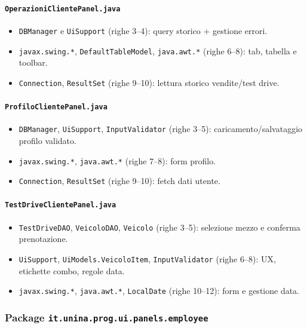 \documentclass[12pt,a4paper]{article}
\begin{document}
\paragraph{\texttt{OperazioniClientePanel.java}}
\begin{itemize}
  \item \texttt{DBManager} e \texttt{UiSupport} (righe 3--4): query storico + gestione errori.
  \item \texttt{javax.swing.*}, \texttt{DefaultTableModel}, \texttt{java.awt.*} (righe 6--8): tab, tabella e toolbar.
  \item \texttt{Connection}, \texttt{ResultSet} (righe 9--10): lettura storico vendite/test drive.
\end{itemize}

\paragraph{\texttt{ProfiloClientePanel.java}}
\begin{itemize}
  \item \texttt{DBManager}, \texttt{UiSupport}, \texttt{InputValidator} (righe 3--5): caricamento/salvataggio profilo validato.
  \item \texttt{javax.swing.*}, \texttt{java.awt.*} (righe 7--8): form profilo.
  \item \texttt{Connection}, \texttt{ResultSet} (righe 9--10): fetch dati utente.
\end{itemize}

\paragraph{\texttt{TestDriveClientePanel.java}}
\begin{itemize}
  \item \texttt{TestDriveDAO}, \texttt{VeicoloDAO}, \texttt{Veicolo} (righe 3--5): selezione mezzo e conferma prenotazione.
  \item \texttt{UiSupport}, \texttt{UiModels.VeicoloItem}, \texttt{InputValidator} (righe 6--8): UX, etichette combo, regole data.
  \item \texttt{javax.swing.*}, \texttt{java.awt.*}, \texttt{LocalDate} (righe 10--12): form e gestione data.
\end{itemize}

\subsubsection*{Package \texttt{it.unina.prog.ui.panels.employee}}
\end{document}

